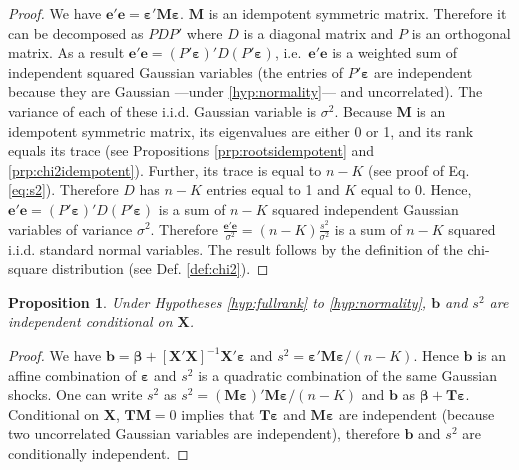 \documentclass[
  11pt,
]{book}
\newtheorem{proposition}{Proposition}[chapter]
\theoremstyle{definition}
\theoremstyle{definition}
\theoremstyle{definition}
\theoremstyle{definition}
\theoremstyle{remark}
\begin{document}
\begin{proof}
We have \(\mathbf{e}'\mathbf{e}=\boldsymbol\varepsilon'\mathbf{M}\boldsymbol\varepsilon\). \(\mathbf{M}\) is an idempotent symmetric matrix. Therefore it can be decomposed as \(PDP'\) where \(D\) is a diagonal matrix and \(P\) is an orthogonal matrix. As a result \(\mathbf{e}'\mathbf{e} = (P'\boldsymbol\varepsilon)'D(P'\boldsymbol\varepsilon)\), i.e.~\(\mathbf{e}'\mathbf{e}\) is a weighted sum of independent squared Gaussian variables (the entries of \(P'\boldsymbol\varepsilon\) are independent because they are Gaussian ---under \ref{hyp:normality}--- and uncorrelated). The variance of each of these i.i.d. Gaussian variable is \(\sigma^2\). Because \(\mathbf{M}\) is an idempotent symmetric matrix, its eigenvalues are either 0 or 1, and its rank equals its trace (see Propositions \ref{prp:rootsidempotent} and \ref{prp:chi2idempotent}). Further, its trace is equal to \(n-K\) (see proof of Eq. \eqref{eq:s2}). Therefore \(D\) has \(n-K\) entries equal to 1 and \(K\) equal to 0. Hence, \(\mathbf{e}'\mathbf{e} = (P'\boldsymbol\varepsilon)'D(P'\boldsymbol\varepsilon)\) is a sum of \(n-K\) squared independent Gaussian variables of variance \(\sigma^2\). Therefore \(\frac{\mathbf{e}'\mathbf{e}}{\sigma^2} = (n-K)\frac{s^2}{\sigma^2}\) is a sum of \(n-K\) squared i.i.d. standard normal variables. The result follows by the definition of the chi-square distribution (see Def. \ref{def:chi2}).
\end{proof}

\begin{proposition}
\protect\hypertarget{prp:indeps2b}{}\label{prp:indeps2b}Under Hypotheses \ref{hyp:fullrank} to \ref{hyp:normality}, \(\mathbf{b}\) and \(s^2\) are independent conditional on \(\mathbf{X}\).
\end{proposition}

\begin{proof}
We have \(\mathbf{b}=\boldsymbol\beta + [\mathbf{X}'{\mathbf{X}}]^{-1}\mathbf{X}'\boldsymbol\varepsilon\) and \(s^2 = \boldsymbol\varepsilon' \mathbf{M} \boldsymbol\varepsilon/(n-K)\). Hence \(\mathbf{b}\) is an affine combination of \(\boldsymbol\varepsilon\) and \(s^2\) is a quadratic combination of the same Gaussian shocks. One can write \(s^2\) as \(s^2 = (\mathbf{M}\boldsymbol\varepsilon)' \mathbf{M} \boldsymbol\varepsilon/(n-K)\) and \(\mathbf{b}\) as \(\boldsymbol\beta + \mathbf{T}\boldsymbol\varepsilon\). Conditional on \(\mathbf{X}\), \(\mathbf{T}\mathbf{M}=0\) implies that \(\mathbf{T}\boldsymbol\varepsilon\) and \(\mathbf{M}\boldsymbol\varepsilon\) are independent (because two uncorrelated Gaussian variables are independent), therefore \(\mathbf{b}\) and \(s^2\) are conditionally independent.
\end{proof}
\end{document}
